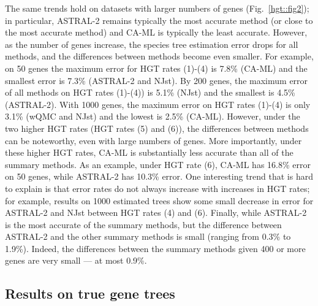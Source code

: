 The same trends hold on datasets with larger 
numbers of genes (Fig.~\ref{hgt::fig2}); in particular, ASTRAL-2 remains typically the most accurate method (or close to the most accurate method) and CA-ML is typically the least accurate.  However, as the
number of genes increase, the species tree estimation error drops for all methods, and the differences between methods become even  smaller.  For example, on 50 genes the maximum
error for HGT rates (1)-(4) is 7.8\% (CA-ML)  and 
the smallest error is 7.3\% (ASTRAL-2 and NJst). 
By 200 genes, the maximum error of all methods on HGT rates (1)-(4))  is 
5.1\% (NJst) and the smallest is 4.5\% (ASTRAL-2). 
With
1000 genes, the maximum error on HGT rates (1)-(4) is only 3.1\% (wQMC and NJst) and  the lowest is 2.5\% (CA-ML).  
However, under the two higher HGT rates (HGT rates (5) and (6)), the differences between
methods can be noteworthy, even with large numbers of genes. 
More importantly, under these higher HGT rates, 
CA-ML is substantially less accurate than all of the summary methods. 
As an example, under HGT rate (6), 
CA-ML has 16.8\% error on 50 genes, 
while ASTRAL-2 has 10.3\% error. 
One interesting trend that is hard to explain is that error
rates do not always increase with increases in HGT rates; 
for example, results on 1000 estimated trees show some small
 decrease in error
for ASTRAL-2 and NJst between HGT rates (4) and (6). 
Finally, while ASTRAL-2 is the most accurate of the 
summary methods, but
the difference between ASTRAL-2 and the other summary methods is small (ranging from  0.3\% to 1.9\%). 
Indeed, the differences between 
the summary methods given 400 or more genes are very small — 
at most 0.9\%. 



\subsection{Results on true gene trees}

